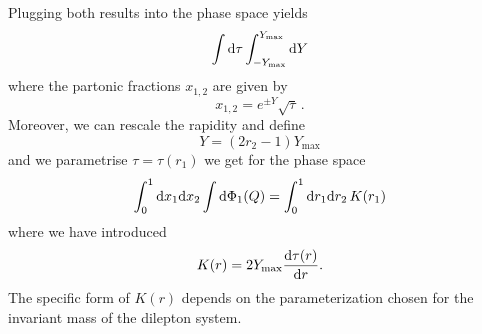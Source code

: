 \documentclass[a4paper,11pt]{article}
\begin{document}
Plugging both results into the phase space yields
\begin{equation}
\int \mathrm d \tau \int^{Y_{\max}}_{-Y_{\max}} \mathrm d Y
\end{equation}
where the partonic fractions $x_{1,2}$ are given by
\begin{equation}
x_{1,2} = e^{\pm Y} \sqrt{\tau}\, .
\end{equation}
Moreover, we can rescale the rapidity and define
\begin{equation}
\label{eq:rapidityrescale}
Y = (2 r_2 - 1) Y_{\max}
\end{equation}
and we parametrise $\tau = \tau(r_1)$ we get for the phase space
\begin{equation}
\int^1_0 \mathrm d x_1 \mathrm d x_2 \int \mathrm d \Phi_1 (Q) =
\int^{1}_0 \mathrm d r_1 \mathrm d r_2 \, K(r_1)
\end{equation}
where we have introduced
\begin{equation}
K(r) = 2 Y_{\max} \frac{\mathrm d\tau(r)}{\mathrm d r}.
\end{equation}
The specific form of $K(r)$ depends on the parameterization chosen
for the invariant mass of the dilepton system.
%
%
\end{document}
